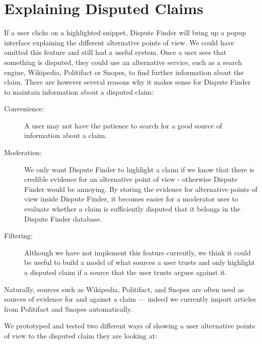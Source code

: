 \documentclass{www2010-submission}
\newcommand{\todo}[1]{}
\begin{document}
\todo{Talk about what dispute finder does, and how it differs - maybe by moving this into the main system section}
\todo{Cite plagarism detection}
\todo{Talk about how our algorithm looks for key terms used in disputed claims}
\todo{Talk about how our first pass NLP algo is rather like }



\section{Explaining Disputed Claims}

If a user clicks on a highlighted snippet, Dispute Finder will bring up a popup interface explaining the different alternative points of view. We could have omitted this feature and still had a useful system. Once a user sees that something is disputed, they could use an alternative service, such as a search engine, Wikipedia, Politifact or Snopes, to find further information about the claim. There are however several reasons why it makes sense for Dispute Finder to maintain information about a disputed claim:

\begin{description}
\item[Convenience:] A user may not have the patience to search for a good source of information about a claim. 
\item[Moderation:] We only want Dispute Finder to highlight a claim if we know that there is credible evidence for an alternative point of view - otherwise Dispute Finder would be annoying. By storing the evidence for alternative points of view inside Dispute Finder, it becomes easier for a moderator user to evaluate whether a claim is sufficiently disputed that it belongs in the Dispute Finder database.
\item[Filtering:] Although we have not implement this feature currently, we think it could be useful to build a model of what sources a user trusts and only highlight a disputed claim if a source that the user trusts argues against it.
\end{description}

Naturally, sources such as Wikipedia, Politifact, and Snopes are often used as sources of evidence for and against a claim --- indeed we currently import articles from Politifact and Snopes automatically.

We prototyped and tested two different ways of showing a user alternative points of view to the disputed claim they are looking at:
\end{document}

